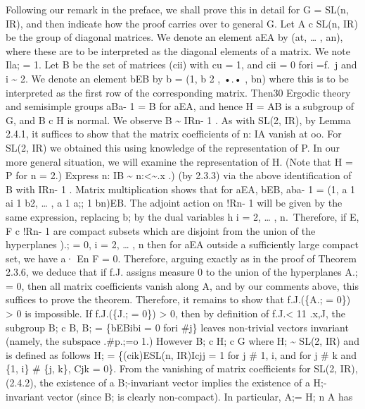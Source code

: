 \documentclass[
  12pt
]{article}
\theoremstyle{break}
\theoremstyle{plain}
\begin{document}
   Following our remark in the preface, we shall
  prove this in detail for G = SL(n, IR), and then indicate how the proof
  carries over to general G. Let A c SL(n, IR) be the group of diagonal
  matrices. We denote an element aEA by (at, \ldots{} , an), where these
  are to be interpreted as the diagonal elements of a matrix. We note Ila;
  = 1. Let B be the set of matrices (cii) with cu = 1, and cii = 0 fori
  =f.~j and i \textasciitilde{} 2. We denote an element bEB by b = (1, b 2
  , •.• , bn) where this is to be interpreted as the first row of the
  corresponding matrix. Then30 Ergodic theory and semisimple groups aBa- 1
  = B for aEA, and hence H = AB is a subgroup of G, and B c H is normal.
  We observe B \textasciitilde{} IRn- 1 . As with SL(2, IR), by Lemma
  2.4.1, it suffices to show that the matrix coefficients of n: IA vanish
  at oo. For SL(2, IR) we obtained this using knowledge of the
  representation of P. In our more general situation, we will examine the
  representation of H. (Note that H = P for n = 2.) Express n: IB
  \textasciitilde{} n:\textless\textasciitilde.x .) (by 2.3.3) via the
  above identification of B with IRn- 1 . Matrix multiplication shows that
  for aEA, bEB, aba- 1 = (1, a 1 ai 1 b2, \ldots{} , a 1 a;; 1 bn)EB. The
  adjoint action on !Rn- 1 will be given by the same expression, replacing
  b; by the dual variables h i = 2, \ldots{} , n.~Therefore, if E, F c
  !Rn- 1 are compact subsets which are disjoint from the union of the
  hyperplanes ).; = 0, i = 2, \ldots{} , n then for aEA outside a
  sufficiently large compact set, we have a· En F = 0. Therefore, arguing
  exactly as in the proof of Theorem 2.3.6, we deduce that if f.J. assigns
  measure 0 to the union of the hyperplanes A.; = 0, then all matrix
  coefficients vanish along A, and by our comments above, this suffices to
  prove the theorem. Therefore, it remains to show that f.J.(\{A.; = 0\})
  \textgreater{} 0 is impossible. If f.J.(\{J.; = 0\}) \textgreater{} 0,
  then by definition of f.J.\textless{} 11 .x,J, the subgroup B; c B, B; =
  \{bEBibi = 0 fori \#j\} leaves non-trivial vectors invariant (namely,
  the subspace .\#p.;=o 1.) However B; c H; c G where H; \textasciitilde{}
  SL(2, IR) and is defined as follows H; = \{(cik)ESL(n, IR)Icjj = 1 for j
  \# 1, i, and for j \# k and \{1, i\} \# \{j, k\}, Cjk = 0\}. From the
  vanishing of matrix coefficients for SL(2, IR), (2.4.2), the existence
  of a B;-invariant vector implies the existence of a H;-invariant vector
  (since B; is clearly non-compact). In particular, A;= H; n A has
\end{document}
